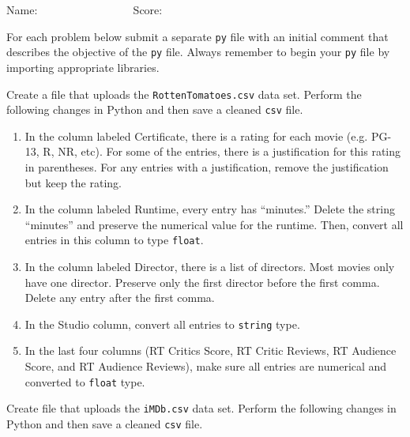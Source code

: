 \documentclass[10pt]{article}
\begin{document}
\vspace{2cm}
\flushright Name: $\qquad \qquad \qquad \qquad $
\flushright Score: $\qquad \qquad \qquad \qquad $

\pagebreak







\flushleft
For each problem below submit a separate \texttt{py} file with an initial comment that describes the objective of the \texttt{py} file.  Always remember to begin your \texttt{py} file by importing appropriate libraries.  

\begin{enumerate}[{$\qquad 1.]$}]

\item Create a file that uploads the \texttt{RottenTomatoes.csv} data set.  Perform the following changes in Python and then save a cleaned \texttt{csv} file.  

\begin{enumerate}[{$\quad a.)$}]
	\item In the column labeled Certificate, there is a rating for each movie (e.g. PG-13, R, NR, etc).  For some of the entries, there is a justification for this rating in parentheses.  For any entries with a justification, remove the justification but keep the rating.  
	
	\item In the column labeled Runtime, every entry has ``minutes.'' Delete the string ``minutes'' and preserve the numerical value for the runtime.  Then, convert all entries in this column to type \texttt{float}.  
	
	\item In the column labeled Director, there is a list of directors.  Most movies only have one director.  Preserve only the first director before the first comma.  Delete any entry after the first comma.  
	
	\item In the Studio column, convert all entries to \texttt{string} type. 
	
	\item In the last four columns (RT Critics Score, RT Critic Reviews, RT Audience Score, and RT Audience Reviews), make sure all entries are numerical and converted to \texttt{float} type. 
	
\end{enumerate}


\item Create file that uploads the \texttt{iMDb.csv} data set.  Perform the following changes in Python and then save a cleaned \texttt{csv} file. 


\end{enumerate}
\end{document}
